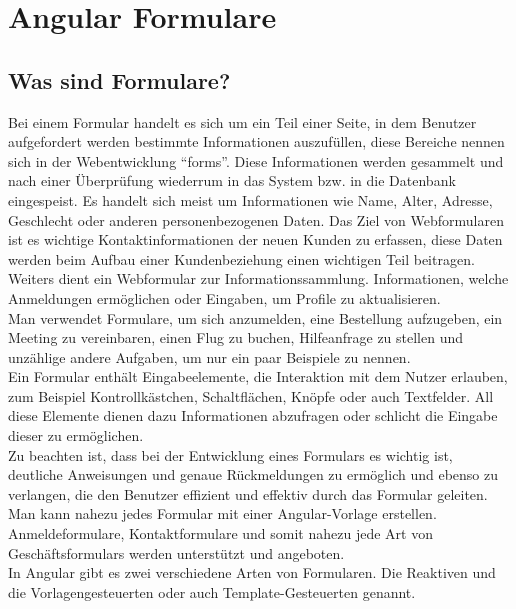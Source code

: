 \section{Angular Formulare}
\subsection{Was sind Formulare?}
Bei einem Formular handelt es sich um ein Teil einer Seite, in dem Benutzer aufgefordert werden bestimmte Informationen auszufüllen, diese Bereiche nennen sich in der Webentwicklung “forms”. Diese Informationen werden gesammelt und nach einer Überprüfung wiederrum in das System bzw. in die Datenbank eingespeist. Es handelt sich meist um Informationen wie Name, Alter, Adresse, Geschlecht oder anderen personenbezogenen Daten. Das Ziel von Webformularen ist es wichtige Kontaktinformationen der neuen Kunden zu erfassen, diese Daten werden beim Aufbau einer Kundenbeziehung einen wichtigen Teil beitragen.\\
Weiters dient ein Webformular zur Informationssammlung. Informationen, welche Anmeldungen ermöglichen oder Eingaben, um Profile zu aktualisieren.\\
Man verwendet Formulare, um sich anzumelden, eine Bestellung aufzugeben, ein Meeting zu vereinbaren, einen Flug zu buchen, Hilfeanfrage zu stellen und unzählige andere Aufgaben, um nur ein paar Beispiele zu nennen.\\
Ein Formular enthält Eingabeelemente, die Interaktion mit dem Nutzer erlauben, zum Beispiel Kontrollkästchen, Schaltflächen, Knöpfe oder auch Textfelder. All diese Elemente dienen dazu Informationen abzufragen oder schlicht die Eingabe dieser zu ermöglichen.\\
Zu beachten ist, dass bei der Entwicklung eines Formulars es wichtig ist, deutliche Anweisungen und genaue Rückmeldungen zu ermöglich und ebenso zu verlangen, die den Benutzer effizient und effektiv durch das Formular geleiten.\\
Man kann nahezu jedes Formular mit einer Angular-Vorlage erstellen. Anmeldeformulare, Kontaktformulare und somit nahezu jede Art von Geschäftsformulars werden unterstützt und angeboten.\\
In Angular gibt es zwei verschiedene Arten von Formularen. Die Reaktiven und die Vorlagengesteuerten oder auch Template-Gesteuerten genannt.

